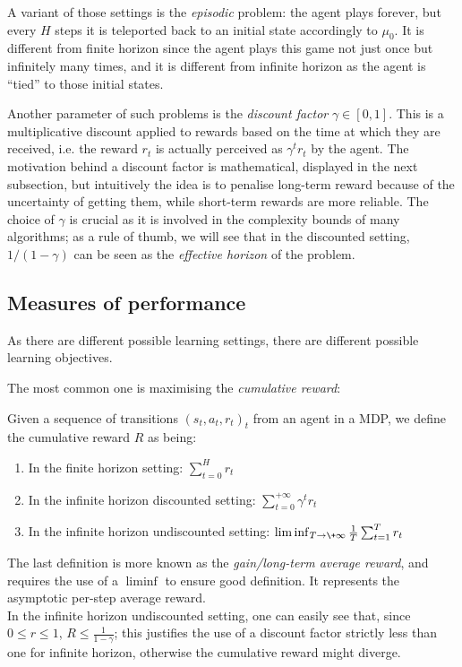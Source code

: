 A variant of those settings is the \emph{episodic} problem: the agent plays forever, but every $H$ steps it is teleported back to an initial state accordingly to $\mu_0$. It is different from finite horizon since the agent plays this game not just once but infinitely many times, and it is different from infinite horizon as the agent is ``tied'' to those initial states.

Another parameter of such problems is the \emph{discount factor} $\gamma \in [0, 1]$. This is a multiplicative discount applied to rewards based on the time at which they are received, i.e. the reward $r_t$ is actually perceived as $\gamma^t r_t$ by the agent. The motivation behind a discount factor is mathematical, displayed in the next subsection, but intuitively the idea is to penalise long-term reward because of the uncertainty of getting them, while short-term rewards are more reliable. The choice of $\gamma$ is crucial as it is involved in the complexity bounds of many algorithms; as a rule of thumb, we will see that in the discounted setting, $1/(1 - \gamma)$ can be seen as the \emph{effective horizon} of the problem.

\subsection{Measures of performance}
\label{subsec:MDP-measures}

As there are different possible learning settings, there are different possible learning objectives.

The most common one is maximising the \emph{cumulative reward}:

\begin{defi}
  Given a sequence of transitions $(s_t, a_t, r_t)_t$ from an agent in a MDP, we define the cumulative reward $R$ as being:
  \begin{enumerate}
  \item In the finite horizon setting: $\sum_{t=0}^{H}r_t$
  \item In the infinite horizon discounted setting: $\sum_{t=0}^{+\infty} \gamma^t r_t$
  \item In the infinite horizon undiscounted setting: $\liminf_{T \to \+\infty} \frac{1}{T}\sum_{t=1}^{T} r_t$
  \end{enumerate}
  The last definition is more known as the \emph{gain/long-term average reward}, and requires the use of a $\liminf$ to ensure good definition. It represents the asymptotic per-step average reward.\\
  In the infinite horizon undiscounted setting, one can easily see that, since $0 \leq r \leq 1$, $R \leq \frac{1}{1 - \gamma}$; this justifies the use of a discount factor strictly less than one for infinite horizon, otherwise the cumulative reward might diverge.
\end{defi}

